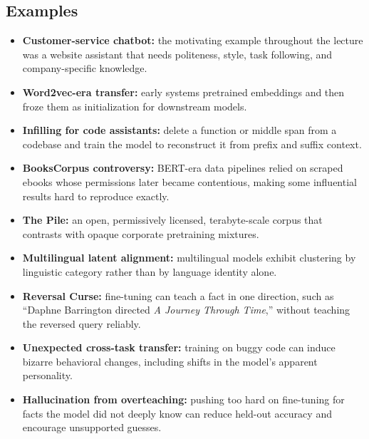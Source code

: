 \documentclass[11pt]{article}
\begin{document}
\subsection{Examples}
\begin{itemize}
    \item \textbf{Customer-service chatbot:} the motivating example throughout the lecture was a website assistant that needs politeness, style, task following, and company-specific knowledge.
    \item \textbf{Word2vec-era transfer:} early systems pretrained embeddings and then froze them as initialization for downstream models.
    \item \textbf{Infilling for code assistants:} delete a function or middle span from a codebase and train the model to reconstruct it from prefix and suffix context.
    \item \textbf{BooksCorpus controversy:} BERT-era data pipelines relied on scraped ebooks whose permissions later became contentious, making some influential results hard to reproduce exactly.
    \item \textbf{The Pile:} an open, permissively licensed, terabyte-scale corpus that contrasts with opaque corporate pretraining mixtures.
    \item \textbf{Multilingual latent alignment:} multilingual models exhibit clustering by linguistic category rather than by language identity alone.
    \item \textbf{Reversal Curse:} fine-tuning can teach a fact in one direction, such as ``Daphne Barrington directed \emph{A Journey Through Time},'' without teaching the reversed query reliably.
    \item \textbf{Unexpected cross-task transfer:} training on buggy code can induce bizarre behavioral changes, including shifts in the model's apparent personality.
    \item \textbf{Hallucination from overteaching:} pushing too hard on fine-tuning for facts the model did not deeply know can reduce held-out accuracy and encourage unsupported guesses.
\end{itemize}
\end{document}

